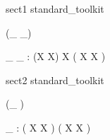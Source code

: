\begin{zsection}
\SECTION sect1 \parents standard\_toolkit
\end{zsection}


\begin{zed}
 \leftassoc (\_ \foo \_)
\end{zed}

\begin{gendef}[X]
\_ \foo \_ : (X \rel X) \cross \power X \fun ( X \rel X )
\end{gendef}

\begin{zsection}
\SECTION sect2 \parents standard\_toolkit
\end{zsection}


\begin{zed}
\function (\_ \foo)
\end{zed}

\begin{gendef}[X]
\_ \foo : ( X \rel X ) \fun ( X \rel X )
\end{gendef}
